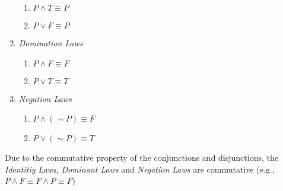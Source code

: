 \documentclass[12pt]{article}
\begin{document}
\begin{enumerate}
\begin{enumerate}[label = \alph*]
		\item $P \wedge T \equiv P$
		\item $P \vee F \equiv P$
	\end{enumerate}
	\item \emph{Domination Laws}
	\begin{enumerate}[label = \alph*]
		\item $P \wedge F \equiv F$
		\item $P \vee T \equiv T$
	\end{enumerate}
	\item \emph{Negation Laws}
	\begin{enumerate}[label = \alph*]
		\item $P \wedge (\sim P) \equiv F$
		\item $P \vee (\sim P) \equiv T$
	\end{enumerate}
\end{enumerate}
\noindent Due to the commutative property of the conjunctions and disjunctions, the \textit{Identitiy Laws}, \textit{Dominant Laws} and \textit{Negation Laws} are commutative (e.g., $P \wedge F \equiv F \wedge P \equiv F$)
\end{document}
